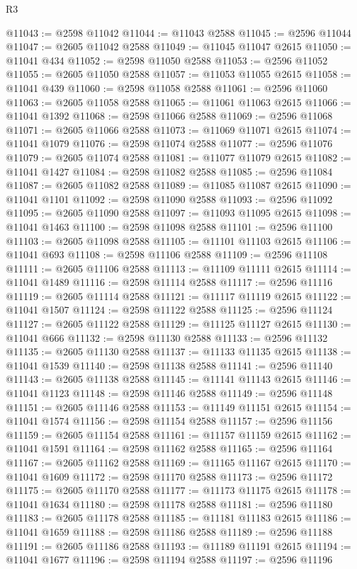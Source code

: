 \begin{lexlean}{R3}
\begin{coremodule}
@11043 := @2598 @11042
@11044 := @11043 @2588
@11045 := @2596 @11044
@11047 := @2605 @11042 @2588
@11049 := @11045 @11047 @2615
@11050 := @11041 @434
@11052 := @2598 @11050 @2588
@11053 := @2596 @11052
@11055 := @2605 @11050 @2588
@11057 := @11053 @11055 @2615
@11058 := @11041 @439
@11060 := @2598 @11058 @2588
@11061 := @2596 @11060
@11063 := @2605 @11058 @2588
@11065 := @11061 @11063 @2615
@11066 := @11041 @1392
@11068 := @2598 @11066 @2588
@11069 := @2596 @11068
@11071 := @2605 @11066 @2588
@11073 := @11069 @11071 @2615
@11074 := @11041 @1079
@11076 := @2598 @11074 @2588
@11077 := @2596 @11076
@11079 := @2605 @11074 @2588
@11081 := @11077 @11079 @2615
@11082 := @11041 @1427
@11084 := @2598 @11082 @2588
@11085 := @2596 @11084
@11087 := @2605 @11082 @2588
@11089 := @11085 @11087 @2615
@11090 := @11041 @1101
@11092 := @2598 @11090 @2588
@11093 := @2596 @11092
@11095 := @2605 @11090 @2588
@11097 := @11093 @11095 @2615
@11098 := @11041 @1463
@11100 := @2598 @11098 @2588
@11101 := @2596 @11100
@11103 := @2605 @11098 @2588
@11105 := @11101 @11103 @2615
@11106 := @11041 @693
@11108 := @2598 @11106 @2588
@11109 := @2596 @11108
@11111 := @2605 @11106 @2588
@11113 := @11109 @11111 @2615
@11114 := @11041 @1489
@11116 := @2598 @11114 @2588
@11117 := @2596 @11116
@11119 := @2605 @11114 @2588
@11121 := @11117 @11119 @2615
@11122 := @11041 @1507
@11124 := @2598 @11122 @2588
@11125 := @2596 @11124
@11127 := @2605 @11122 @2588
@11129 := @11125 @11127 @2615
@11130 := @11041 @666
@11132 := @2598 @11130 @2588
@11133 := @2596 @11132
@11135 := @2605 @11130 @2588
@11137 := @11133 @11135 @2615
@11138 := @11041 @1539
@11140 := @2598 @11138 @2588
@11141 := @2596 @11140
@11143 := @2605 @11138 @2588
@11145 := @11141 @11143 @2615
@11146 := @11041 @1123
@11148 := @2598 @11146 @2588
@11149 := @2596 @11148
@11151 := @2605 @11146 @2588
@11153 := @11149 @11151 @2615
@11154 := @11041 @1574
@11156 := @2598 @11154 @2588
@11157 := @2596 @11156
@11159 := @2605 @11154 @2588
@11161 := @11157 @11159 @2615
@11162 := @11041 @1591
@11164 := @2598 @11162 @2588
@11165 := @2596 @11164
@11167 := @2605 @11162 @2588
@11169 := @11165 @11167 @2615
@11170 := @11041 @1609
@11172 := @2598 @11170 @2588
@11173 := @2596 @11172
@11175 := @2605 @11170 @2588
@11177 := @11173 @11175 @2615
@11178 := @11041 @1634
@11180 := @2598 @11178 @2588
@11181 := @2596 @11180
@11183 := @2605 @11178 @2588
@11185 := @11181 @11183 @2615
@11186 := @11041 @1659
@11188 := @2598 @11186 @2588
@11189 := @2596 @11188
@11191 := @2605 @11186 @2588
@11193 := @11189 @11191 @2615
@11194 := @11041 @1677
@11196 := @2598 @11194 @2588
@11197 := @2596 @11196

\end{coremodule}
\end{lexlean}
